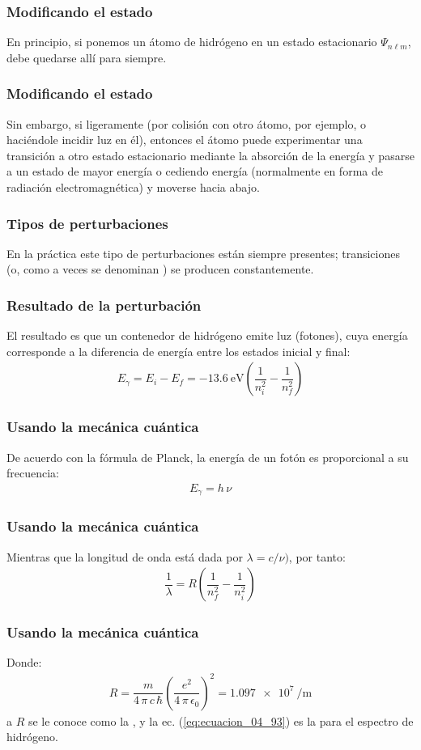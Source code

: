 \documentclass[12pt]{beamer}
\begin{document}
\begin{frame}
\frametitle{Modificando el estado}
En principio, si ponemos un átomo de hidrógeno en un estado estacionario $\Psi_{n \ell m}$, debe quedarse allí para siempre.
\end{frame}
\begin{frame}
\frametitle{Modificando el estado}
Sin embargo, si  ligeramente (por colisión con otro átomo, por ejemplo, o haciéndole incidir  luz en él), entonces el átomo puede experimentar una transición a otro estado estacionario mediante la absorción de la energía y pasarse a un estado de mayor energía o cediendo energía (normalmente en forma de radiación electromagnética) y moverse  hacia abajo.
\end{frame}
\begin{frame}
\frametitle{Tipos de perturbaciones}
En la práctica este tipo de perturbaciones están siempre presentes; transiciones (o, como a veces se denominan ) se producen constantemente.
\end{frame}
\begin{frame}
\frametitle{Resultado de la perturbación}
El resultado es que un contenedor de hidrógeno emite luz (fotones), cuya energía corresponde a la diferencia de energía entre los estados inicial y final:
\pause
\begin{align}
E_{\gamma} = E_{i} - E_{f} = \SI{-13.6}{\electronvolt} \left( \dfrac{1}{n_{i}^{2}} - \dfrac{1}{n_{f}^{2}} \right)
\label{eq:ecuacion_04_91}
\end{align}
\end{frame}
\begin{frame}
\frametitle{Usando la mecánica cuántica}
De acuerdo con la fórmula de Planck, la energía de un fotón es proporcional a su frecuencia:
\pause
\begin{align}
E_{\gamma} = h \, \nu
\label{eq:ecuacion_04_92}
\end{align}
\end{frame}
\begin{frame}
\frametitle{Usando la mecánica cuántica}
Mientras que la longitud de onda está dada por $\lambda = c / \nu)$, por tanto:
\pause
\begin{align}
\dfrac{1}{\lambda} = R \left( \dfrac{1}{n_{f}^{2}} - \dfrac{1}{n_{i}^{2}} \right)
\label{eq:ecuacion_04_93}
\end{align}
\end{frame}
\begin{frame}
\frametitle{Usando la mecánica cuántica}
Donde:
\pause
\begin{align}
R = \dfrac{m}{4 \, \pi \, c \, \hbar} \left( \dfrac{e^{2}}{4 \, \pi \, \epsilon_{0}} \right)^{2} = \SI{1.097e7}{\per\metre}
\label{eq:ecuacion_04_94}
\end{align}
\pause
a $R$ se le conoce como la , y la ec. (\ref{eq:ecuacion_04_93}) es la  para el espectro de hidrógeno.
\end{frame}
\end{document}
